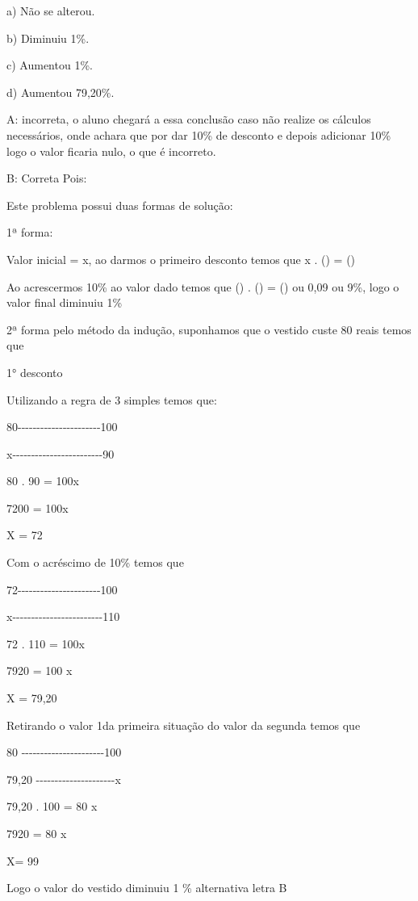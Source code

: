 a) Não se alterou.

b) Diminuiu 1\%.

c) Aumentou 1\%.

d) Aumentou 79,20\%.

A: incorreta, o aluno chegará a essa conclusão caso não realize os
cálculos necessários, onde achara que por dar 10\% de desconto e depois
adicionar 10\% logo o valor ficaria nulo, o que é incorreto.

B: Correta Pois:

Este problema possui duas formas de solução:

1ª forma:

Valor inicial = x, ao darmos o primeiro desconto temos que x .
() = ()

Ao acrescermos 10\% ao valor dado temos que () .
() = () ou 0,09 ou 9\%, logo o valor final
diminuiu 1\%

2ª forma pelo método da indução, suponhamos que o vestido custe 80 reais
temos que

1° desconto

Utilizando a regra de 3 simples temos que:

80-\/-\/-\/-\/-\/-\/-\/-\/-\/-\/-\/-\/-\/-\/-\/-\/-\/-\/-\/-\/-\/-100

x-\/-\/-\/-\/-\/-\/-\/-\/-\/-\/-\/-\/-\/-\/-\/-\/-\/-\/-\/-\/-\/-\/-\/-90

80 . 90 = 100x

7200 = 100x

X = 72

Com o acréscimo de 10\% temos que

72-\/-\/-\/-\/-\/-\/-\/-\/-\/-\/-\/-\/-\/-\/-\/-\/-\/-\/-\/-\/-\/-100

x-\/-\/-\/-\/-\/-\/-\/-\/-\/-\/-\/-\/-\/-\/-\/-\/-\/-\/-\/-\/-\/-\/-\/-110

72 . 110 = 100x

7920 = 100 x

X = 79,20

Retirando o valor 1da primeira situação do valor da segunda temos que

80 -\/-\/-\/-\/-\/-\/-\/-\/-\/-\/-\/-\/-\/-\/-\/-\/-\/-\/-\/-\/-\/-100

79,20 -\/-\/-\/-\/-\/-\/-\/-\/-\/-\/-\/-\/-\/-\/-\/-\/-\/-\/-\/-\/-x

79,20 . 100 = 80 x

7920 = 80 x

X= 99

Logo o valor do vestido diminuiu 1 \% alternativa letra B

